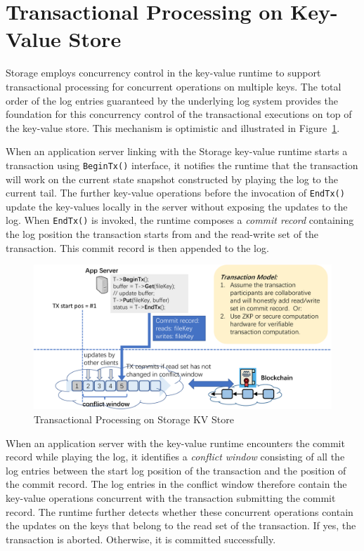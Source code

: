 \section{Transactional Processing on Key-Value Store}

\projabbrev Storage employs concurrency control in the key-value runtime to support transactional processing for concurrent operations on multiple keys. 
The total order of the log entries guaranteed by the underlying log system provides the foundation for this concurrency control of the transactional executions on top of the key-value store. This mechanism is optimistic and illustrated in Figure~\ref{fig:tx}.

When an application server linking with the \projabbrev Storage key-value runtime starts a transaction using \texttt{BeginTx()} interface, it notifies the runtime that the transaction will work on the current state snapshot constructed by playing the log to the current tail.
The further key-value operations before the invocation of \texttt{EndTx()} update the key-values locally in the server without exposing the updates to the log. 
When \texttt{EndTx()} is invoked, the runtime composes a \emph{commit record} containing the log position the transaction starts from and the read-write set of the transaction.  
This commit record is then appended to the log.

\begin{figure}[H]	
	\includegraphics[width=\textwidth]{figure/tx-crop.pdf}
	\caption{Transactional Processing on \projabbrev Storage KV Store}
	\label{fig:tx}
\end{figure}
 
When an application server with the key-value runtime encounters the commit record while playing the log, it identifies a \emph{conflict window} consisting of all the log entries between the start log position of the transaction and the position of the commit record. 
The log entries in the conflict window therefore contain the key-value operations concurrent with the transaction submitting the commit record. 
The runtime further detects whether these concurrent operations contain the updates on the keys that belong to the read set of the transaction.
If yes, the transaction is aborted. Otherwise, it is committed successfully.


